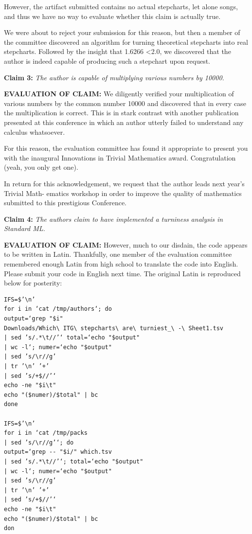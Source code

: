\documentclass[12pt]{article}
\begin{document}
  However, the artifact submitted contains no actual stepcharts, let alone songs, and thus we have no
  way to evaluate whether this claim is actually true.

  We were about to reject your submission for this reason, but then a member of the committee
  discovered an algorithm for turning theoretical stepcharts into real stepcharts. Followed by the
  insight that 1.6266 \textless 2.0, we discovered that the author is indeed capable of producing such a
  stepchart upon request.

\textbf{Claim 3:}  \textit{The author is capable of multiplying various numbers by 10000.}

\textbf{EVALUATION OF CLAIM:}
  We diligently verified your multiplication of various numbers by the common number 10000 and
  discovered that in every case the multiplication is correct. This is in stark contrast with another
  publication presented at this conference in which an author utterly failed to understand any calculus
  whatsoever.

  For this reason, the evaluation committee has found it appropriate to present you with the inaugural Innovations in Trivial Mathematics award. Congratulation (yeah, you only get one).

  In return for this acknowledgement, we request that the author leads next year's Trivial Math-
  ematics workshop in order to improve the quality of mathematics submitted to this prestigious
  Conference.

\textbf{Claim 4:}  \textit{The authors claim to have implemented a turniness analysis in Standard ML.}

\textbf{EVALUATION OF CLAIM:}
  However, much to our disdain, the code appears to be written in Latin. Thankfully, one member
  of the evaluation committee remembered enough Latin from high school to translate the code into
  English. Please submit your code in English next time. The original Latin is reproduced below for
  posterity:

\begin{verbatim}
IFS=$’\n’
for i in ‘cat /tmp/authors‘; do
output=‘grep "$i"
Downloads/Which\ ITG\ stepcharts\ are\ turniest_\ -\ Sheet1.tsv
| sed ’s/.*\t//’‘ total=‘echo "$output"
| wc -l‘; numer=‘echo "$output"
| sed ’s/\r//g’
| tr ’\n’ ’+’
| sed ’s/+$//’‘
echo -ne "$i\t"
echo "($numer)/$total" | bc
done

IFS=$’\n’
for i in ‘cat /tmp/packs
| sed ’s/\r//g’‘; do
output=‘grep -- "$i/" which.tsv
| sed ’s/.*\t//’‘; total=‘echo "$output"
| wc -l‘; numer=‘echo "$output"
| sed ’s/\r//g’
| tr ’\n’ ’+’
| sed ’s/+$//’‘
echo -ne "$i\t"
echo "($numer)/$total" | bc
don
\end{verbatim}
\end{document}
